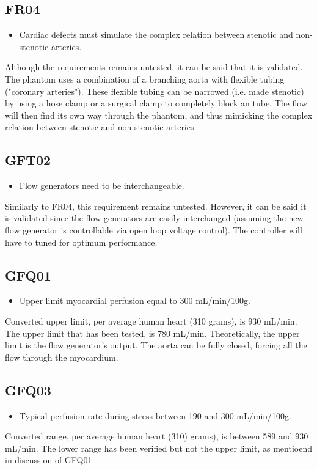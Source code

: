 \subsection*{FR04}
\begin{itemize}
	\item Cardiac defects must simulate the complex relation between stenotic and non-stenotic arteries.
\end{itemize}
Although the requirements remains untested, it can be said that it is validated. The phantom uses a combination of a branching aorta with flexible tubing ("coronary arteries"). These flexible tubing can be narrowed (i.e. made stenotic) by using a hose clamp or a surgical clamp to completely block an tube. The flow will then find its own way through the phantom, and thus mimicking the complex relation between stenotic and non-stenotic arteries.

\subsection*{GFT02}
\begin{itemize}
	\item Flow generators need to be interchangeable.
\end{itemize}
Similarly to FR04, this requirement remains untested. However, it can be said it is validated since the flow generators are easily interchanged (assuming the new flow generator is controllable via open loop voltage control). The controller will have to tuned for optimum performance.

\subsection*{GFQ01}
\begin{itemize}
	\item Upper limit myocardial perfusion equal to 300 mL/min/100g.
\end{itemize}
Converted upper limit, per average human heart (310 grams), is 930 mL/min. The upper limit that has been tested, is 780 mL/min. Theoretically, the upper limit is the flow generator's output. The aorta can be fully closed, forcing all the flow through the myocardium.

\subsection*{GFQ03}
\begin{itemize}
	\item Typical perfusion rate during stress between 190 and 300 mL/min/100g.
\end{itemize}
Converted range, per average human heart (310) grams), is between 589 and 930 mL/min. The lower range has been verified but not the upper limit, as mentioend in discussion of GFQ01.

